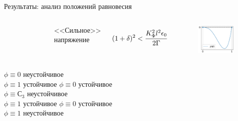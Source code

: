 \documentclass[aspectratio=169]{beamer}
\begin{document}
\begin{frame}{Результаты: анализ положений равновесия}
\begin{columns}
\begin{figure}
	\end{figure}
	\begin{center}
		<<Сильное>> напряжение
	\end{center}
	\vspace{-0.2cm}
	$$(1 + \delta)^2 < \cfrac{K_\Phi^2 l^2 \epsilon_0}{2 \Gamma}$$
	\vspace{-0.7cm}
	\begin{figure}
		\includegraphics[width=\textwidth]{figures/equilibriums_case_3.png}
	\end{figure}
\end{columns}
\begin{columns}
	\hspace{0.5cm}
	$\phi \equiv 0$ неустойчивое \\
	\hspace{0.5cm}
	$\phi \equiv 1$ устойчивое
	\hspace{0.5cm}
	$\phi \equiv 0$ устойчивое \\
	\hspace{0.5cm}
	$\phi \equiv С_3$ неустойчивое \\
	\hspace{0.5cm}
	$\phi \equiv 1$ устойчивое
	\hspace{0.5cm}
	$\phi \equiv 0$ устойчивое \\
	\hspace{0.5cm}
	$\phi \equiv 1$ неустойчивое
\end{columns}
\end{frame}
\end{document}
